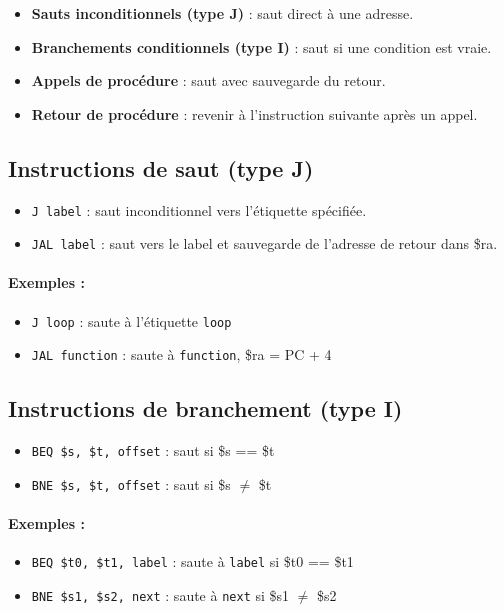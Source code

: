 \documentclass[12pt,a4paper]{article}
\begin{document}
\begin{itemize}
  \item \textbf{Sauts inconditionnels (type J)} : saut direct à une adresse.
  \item \textbf{Branchements conditionnels (type I)} : saut si une condition est vraie.
  \item \textbf{Appels de procédure} : saut avec sauvegarde du retour.
  \item \textbf{Retour de procédure} : revenir à l’instruction suivante après un appel.
\end{itemize}

\subsection{Instructions de saut (type J)}
\begin{itemize}
  \item \texttt{J label} : saut inconditionnel vers l’étiquette spécifiée.
  \item \texttt{JAL label} : saut vers le label et sauvegarde de l’adresse de retour dans \$ra.
\end{itemize}

\paragraph{Exemples :}
\begin{itemize}
  \item \texttt{J loop} : saute à l’étiquette \texttt{loop}
  \item \texttt{JAL function} : saute à \texttt{function}, \$ra = PC + 4
\end{itemize}

\subsection{Instructions de branchement (type I)}
\begin{itemize}
  \item \texttt{BEQ \$s, \$t, offset} : saut si \$s == \$t
  \item \texttt{BNE \$s, \$t, offset} : saut si \$s $\neq$ \$t
\end{itemize}

\paragraph{Exemples :}
\begin{itemize}
  \item \texttt{BEQ \$t0, \$t1, label} : saute à \texttt{label} si \$t0 == \$t1
  \item \texttt{BNE \$s1, \$s2, next} : saute à \texttt{next} si \$s1 $\neq$ \$s2
\end{itemize}
\end{document}
